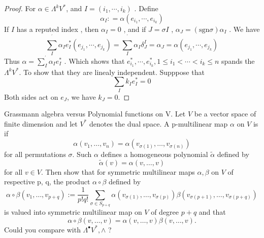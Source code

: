 \documentclass[../main.tex]{subfiles}
\begin{document}
\begin{proof}
   For \(  \alpha  \in  \Lambda ^{k}V^{*}  \), and \(  I= \left(  i_1,\cdots,i_k  \right)   \) . Define \[
    \alpha _{I}: = \alpha \left( e_{i_1},\cdots ,e_{i_{k}} \right) 
    \]  If  \(  I   \) has a reputed index , then \(  \alpha _{I}= 0  \)   , and if \(  J=  \sigma I \) ,  \(  \alpha _{J}= \left( \mathrm{sgn} \sigma  \right)\alpha _{I}   \) .  We have \[
   \sum _{I}^{^{\prime} }\alpha _{I} e^{*}_{I}\left( e_{j_1},\cdots ,e_{j_{k}} \right)= \sum _{I}^{^{\prime} }\alpha _{I}   \delta _{J}^{I}= \alpha _{J}= \alpha \left( e_{j_1},\cdots ,e_{j_{k}} \right) 
    \]Thus  \(  \alpha = \sum _{I}^{^{\prime} }\alpha _{I} e_{I}^{*}  \)  . Which shows that  \(  e^{*}_{i_1},\cdots ,e^{*}_{i_{k}}, 1\le i_1< \cdots < i_{k}\le n  \) spands the  \(   \Lambda ^{k}V^{*}  \).  To show that they are linealy independent.   Supppose that \[
    \sum _{I} k_{I}e ^{*}_{I}= 0
    \] Both sides act on \(  e_{J}   \), we have \(  k_{J}= 0  \).   
\end{proof}

\begin{exercise}{Grassmann algebra versus Polynomial functions on V.}{}
Let $V$ be a vector space of finite dimension and let $V^*$ denotes the dual space.
A p-multilinear map $\alpha$ on $V$ is  if
\[ \alpha(v_1, \dots, v_n) = \alpha(v_{\sigma(1)}, \dots, v_{\sigma(n)}) \]
for all permutations $\sigma$.
Such $\alpha$ defines a homogeneous polynomial $\tilde{\alpha}$ defined by
\[ \tilde{\alpha}(v) = \alpha(v, \dots, v) \]
for all $v \in V$.
Then show that for symmetric multilinear maps $\alpha, \beta$ on $V$ of respective p, q, the product $\alpha \circ \beta$ defined by
\[ \alpha \circ \beta(v_1, \dots, v_{p+q}) := \frac{1}{p!q!} \sum_{\sigma \in S_{p+q}} \alpha(v_{\sigma(1)}, \dots, v_{\sigma(p)}) \beta(v_{\sigma(p+1)}, \dots, v_{\sigma(p+q)}) \]
is valued into symmetric multilinear map on $V$ of degree $p+q$ and that
\[ \alpha \circ \beta(v, \dots, v) = \alpha(v, \dots, v) \beta(v, \dots, v). \]
Could you compare with $\Lambda^\bullet V^*, \wedge$ ?
\end{exercise}
\end{document}
